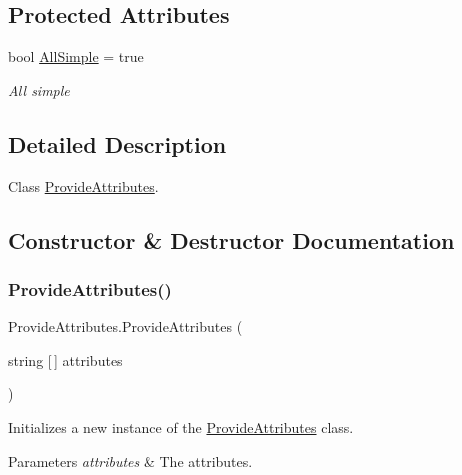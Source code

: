 \subsection*{Protected Attributes}
\begin{DoxyCompactItemize}
\item 
bool \hyperlink{class_provide_attributes_a64e5e27c26a7a969189543b2a6a6467b}{All\+Simple} = true
\begin{DoxyCompactList}\small\item\em All simple \end{DoxyCompactList}\end{DoxyCompactItemize}


\subsection{Detailed Description}
Class \hyperlink{class_provide_attributes}{Provide\+Attributes}. 



\subsection{Constructor \& Destructor Documentation}
\mbox{\label{class_provide_attributes_af23612d88d5f7699f6344fa0472888df}} 
\subsubsection{\texorpdfstring{Provide\+Attributes()}{ProvideAttributes()}\hspace{0.1cm}{\footnotesize\ttfamily [1/2]}}
{\footnotesize\ttfamily Provide\+Attributes.\+Provide\+Attributes (\begin{DoxyParamCaption}\item[{string \mbox{[}$\,$\mbox{]}}]{attributes }\end{DoxyParamCaption})\hspace{0.3cm}{\ttfamily [inline]}}



Initializes a new instance of the \hyperlink{class_provide_attributes}{Provide\+Attributes} class. 


\begin{DoxyParams}{Parameters}
{\em attributes} & The attributes.\\
\hline
\end{DoxyParams}
\mbox{\label{class_provide_attributes_ab743242073ce772ded09b371409283ad}} 
